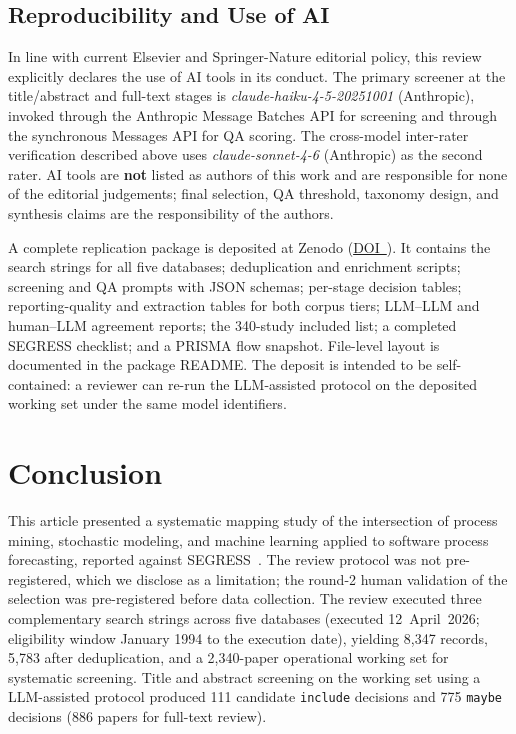 \subsection{Reproducibility and Use of AI}
\label{sec:slr-replication}

In line with current Elsevier and Springer-Nature editorial policy, this
review explicitly declares the use of AI tools in its conduct. The primary
screener at the title/abstract and full-text stages is
\textit{claude-haiku-4-5-20251001} (Anthropic), invoked through the
Anthropic Message Batches API for screening and through the
synchronous Messages API for QA scoring. The cross-model
inter-rater verification described above uses
\textit{claude-sonnet-4-6} (Anthropic) as the second rater. AI tools are
\textbf{not} listed as authors of this work and are responsible for none of
the editorial judgements; final selection, QA threshold, taxonomy design,
and synthesis claims are the responsibility of the authors.

A complete replication package is deposited at Zenodo
(\href{\zenododoiurl}{DOI~\zenododoi}).
It contains the search strings for all five databases; deduplication and
enrichment scripts; screening and QA prompts with JSON schemas; per-stage
decision tables; reporting-quality and extraction tables for both corpus
tiers; LLM--LLM and human--LLM agreement reports; the 340-study included
list; a completed SEGRESS checklist; and a PRISMA flow snapshot.
File-level layout is documented in the package README. The deposit is
intended to be self-contained: a reviewer can re-run the LLM-assisted
protocol on the deposited working set under the same model identifiers.


\section{Conclusion}
\label{sec:slr-summary}

This article presented a systematic mapping study of the intersection of
process mining, stochastic modeling, and machine learning applied to software
process forecasting, reported against SEGRESS~\cite{kitchenham2023segress}.
The review protocol was not pre-registered, which we disclose as a
limitation; the round-2 human validation of the selection was pre-registered
before data collection.
The review executed three complementary search strings across five databases
(executed 12~April~2026; eligibility window January 1994 to the execution
date), yielding 8{,}347
records, 5{,}783 after deduplication, and a 2{,}340-paper operational working
set for systematic screening. Title
and abstract screening on the working set using a LLM-assisted protocol
produced 111 candidate \texttt{include} decisions and 775 \texttt{maybe}
decisions (886 papers for full-text review).

